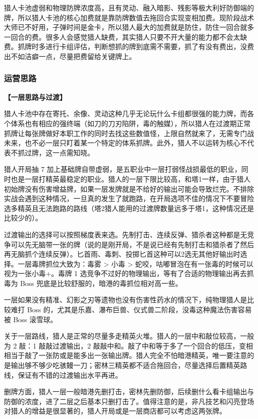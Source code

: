 \documentclass[12pt, a4paper]{article}
\begin{document}
猎人卡池虚弱和物理防牌浓度高，且有灵动、融入暗影、残影等极大利好防御端的牌，所以猎人卡池的核心加费就是靠防牌数值去拖回合实现变相加费。现阶段战术大师已不好用，子弹时间是金卡，所以猎人最大的加费就是防住，防住一回合就多一回合的费。很多人会感觉猎人缺费，其实猎人只要不开大量的能力都不会太缺费。抓牌时多进行卡组评估，判断想抓的牌到底需不需要，抓了有没有费出，没费出不如洁癖一点，尽量把费留给关键牌上。

\subsubsection{运营思路}

\textbf{【一层思路与过渡】}

猎人卡池中存在寄托、余像、灵动这种几乎无论玩什么卡组都很强的能力牌，而各个体系也有相应的强终端（如刀的刀刃陷阱，毒的触媒），所以猎人在过渡期正常抓牌让每张牌做好本职工作的同时去找这些数值怪，上限自然就来了，无需专门战未来，也不必一层只盯着某一个特定的体系抓牌。此外，猎人不以运转为核心不代表不抓过牌，这一点需知晓。

猎人开局抽 7 加上基础牌自带虚弱，是五职业中一层打弱怪战损最低的职业，同时也是一层打精英最稳定的职业。猎人的一层下限比较高，和塔1一样，由于猎人初始牌没有伤害增益牌，如果一层发牌就是不给好的输出可能会导致烂完。不排除实战会遇到这种情况，一旦真的发生了就跑路，在开局选项不佳的情况下不要冒险选多精英且无法跑路的路线（塔2猎人能用的过渡牌数量远多于塔1，这种情况还是比较少的）。

过渡输出的选择可以按照梯度表来选。先制打击、连续反弹、猎杀者这种都是无竞争可以先无脑带一张的牌（说的是刚开局，不是说已经有先制打击和猎杀者了然后再无脑抓个连续反弹）。匕首雨、毒刺、投掷匕首这种可以2选无其他好输出时选择。一层毒牌抓位大致为：毒雾 \textgreater{} 小毒 \textgreater{} 蛇咬，咕嘟冒泡在有一张毒的时候可以视为一张小毒+。毒牌 1 选竞争不过好的物理输出，等有了合适的物理输出再去抓毒为 Boss 兜底是比较舒服的，暗港的毒抓位相对高一些。

一层如果没有精准、幻影之刃等遗物也没有伤害性药水的情况下，纯物理猎人是比较难打 Boss 的，尤其是乐嘉、瀑布巨兽、仪式兽二阶段，没毒这种魔法伤害容易被 Boss 滚雪球。

关于一层路线，猎人是正常的尽量多走精英火堆。猎人的一层中和敲位较高，一般为 2 敲：1 敲敲过渡输出，2 敲敲中和。敲了中和等于多了一个回合的低压，变相相当于敲了一张防或是能多出一张输出牌。猎人完全不怕暗港精英，唯一要注意的是输出够不够少吃骇鳗一刀；密林三精英都不适合拖回合，尽量选择后置精英路线，保证有不错的过渡输出水平再进。

删牌方面，猎人一层一般暗港先删打击，密林先删防御，后续删什么看卡组输出与防御的浓度，进了二层之后基本只删打击了。值得注意的是，非凡技艺和闪亮登场对猎人的增益是很显著的，猎人开局或是一层商店都可以考虑这两张牌。
\end{document}
